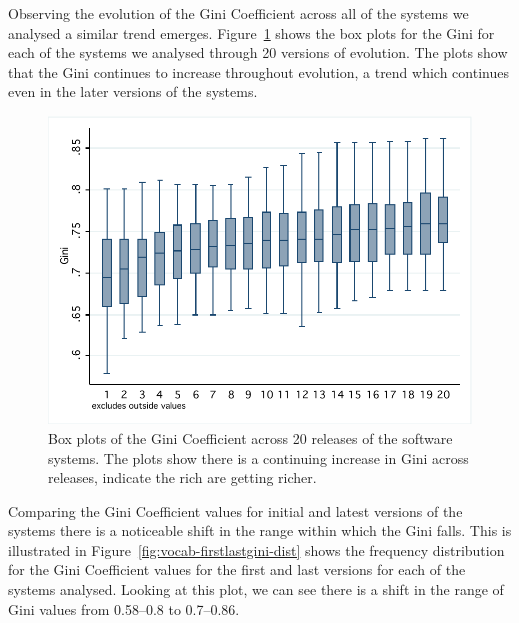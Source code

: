 Observing the evolution of the Gini Coefficient across all of the systems we analysed a similar trend emerges. Figure~\ref{fig:vocab-gini-rsn20-box} shows the box plots for the Gini for each of the systems we analysed through 20 versions of evolution. The plots show that the Gini continues to increase throughout evolution, a trend which continues even in the later versions of the systems.

\begin{figure}[t]
\centering
\includegraphics[width=\textwidth]{Figures/Vocab-RSN20GiniBox.pdf}
\caption{Box plots of the Gini Coefficient across 20 releases of the software systems. The plots show there is a continuing increase in Gini across releases, indicate the rich are getting richer.}
\label{fig:vocab-gini-rsn20-box}
\end{figure}

Comparing the Gini Coefficient values for initial and latest versions of the systems there is a noticeable shift in the range within which the Gini falls. This is illustrated in Figure~\ref{fig:vocab-firstlastgini-dist} shows the frequency distribution for the Gini Coefficient values for the first and last versions for each of the systems analysed. Looking at this plot, we can see there is a shift in the range of Gini values from 0.58--0.8 to 0.7--0.86.

